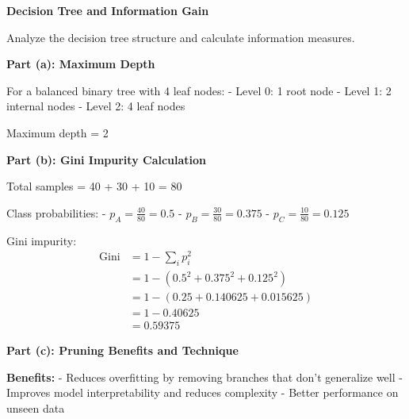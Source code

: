 \documentclass{../../common/quals-template}
\begin{document}
\begin{questions}
\question[6] \textbf{Decision Tree and Information Gain}

Analyze the decision tree structure and calculate information measures.


\begin{solution}
\textbf{Part (a): Maximum Depth}

For a balanced binary tree with 4 leaf nodes:
- Level 0: 1 root node
- Level 1: 2 internal nodes  
- Level 2: 4 leaf nodes

Maximum depth = 2

\textbf{Part (b): Gini Impurity Calculation}

Total samples = 40 + 30 + 10 = 80

Class probabilities:
- $p_A = \frac{40}{80} = 0.5$
- $p_B = \frac{30}{80} = 0.375$ 
- $p_C = \frac{10}{80} = 0.125$

Gini impurity:
\begin{align}
\text{Gini} &= 1 - \sum_{i} p_i^2\\
&= 1 - (0.5^2 + 0.375^2 + 0.125^2)\\
&= 1 - (0.25 + 0.140625 + 0.015625)\\
&= 1 - 0.40625\\
&= 0.59375
\end{align}

\textbf{Part (c): Pruning Benefits and Technique}

\textbf{Benefits:}
- Reduces overfitting by removing branches that don't generalize well
- Improves model interpretability and reduces complexity
- Better performance on unseen data


\end{solution}
\end{questions}
\end{document}
